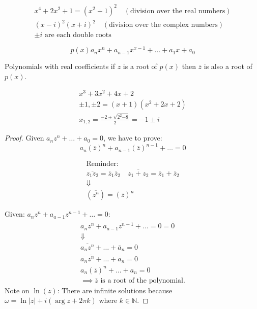 \documentclass[00_complete]{subfiles}
\begin{document}
\[
\begin{gathered}
    x^4+2x^2+1 = (x^2+1)^2 \quad (\text{division over the real numbers}) \\
    (x-i)^2(x+i)^2 \quad (\text{division over the complex numbers}) \\
    \pm i \text{ are each double roots} \tag{4}
\end{gathered}
\]
\begin{claim}
\[
p(x)a_nx^n+a_{n-1}x^{x-1}+\ldots+a_1x+a_0
\]

Polynomials with real coefficients if \(z\) is a root of \(p(x)\) then
\(\overline z\) is also a root of \(p(x)\).

\end{claim}
\begin{example}
\[
\begin{gathered}
x^3+3x^2+4x+2 \\
\pm1, \pm 2 = (x+1)(x^2+2x+2) \\
x_{1,2} = \frac{-2 \pm \sqrt{2^2{-8}}}{2} = \boxed{-1 \pm i}
\end{gathered}
\]

\end{example}
\begin{proof}
Given \(a_nz^n+ \ldots + a_0=0\), we have to prove: \[
a_n(\overline z)^n + a_{n-1}(\overline z)^{n-1}+ \ldots = 0
\]

\[
\begin{gathered}
    \text{Reminder:} \\
    \overline{z_1z_2} = \overline z_1 \overline z_2 \quad \overline{z_1+z_2} = \overline z_1 + \overline z_2 \\
    \Downarrow \\
    (\overline{z^n}) = (\overline z)^n
\end{gathered}
\]

Given: \(a_nz^n+a_{a-1}z^{n-1}+\ldots = 0\): \[
\begin{gathered}
\overline{a_nz^n+a_{a-1}z^{n-1}+\ldots = 0} = \overline 0 \\ \Downarrow \\
\overline{a_nz^n} + \ldots + \overline a_n = 0 \\
\overline{a_n}\overline{z^n} + \ldots + \overline a_n = 0 \\
a_n(\overline z)^n + \ldots + a_n = 0 \\
\implies \overline z \text{ is a root of the polynomial.}
\end{gathered}
\] Note on \(\ln(z)\): There are infinite solutions because
\(\omega = \ln |z| + i(\arg z+2\pi k)\) where \(k \in \mathbb{N}\).

\end{proof}
\end{document}
